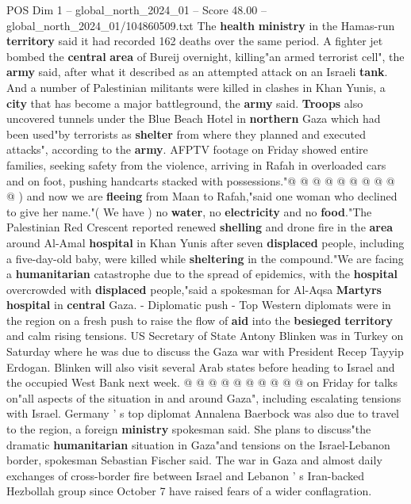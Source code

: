 \begin{textsample}{POS Dim 1 – global\_north\_2024\_01 – Score 48.00 – global\_north\_2024\_01/104860509.txt}
The \textbf{health} \textbf{ministry} in the Hamas-run \textbf{territory} said it had recorded 162 deaths over the same period.
A fighter jet bombed the \textbf{central} \textbf{area} of Bureij overnight, killing"an armed terrorist cell", the \textbf{army} said, after what it described as an attempted attack on an Israeli \textbf{tank}.
And a number of Palestinian militants were killed in clashes in Khan Yunis, a \textbf{city} that has become a major battleground, the \textbf{army} said. \textbf{Troops} also uncovered tunnels under the Blue Beach Hotel in \textbf{northern} Gaza which had been used"by terrorists as \textbf{shelter} from where they planned and executed attacks", according to the \textbf{army}.
AFPTV footage on Friday showed entire families, seeking safety from the violence, arriving in Rafah in overloaded cars and on foot, pushing handcarts stacked with possessions."@ @ @ @ @ @ @ @ @ @ ) and now we are \textbf{fleeing} from Maan to Rafah,"said one woman who declined to give her name."( We have ) no \textbf{water}, no \textbf{electricity} and no \textbf{food}."The Palestinian Red Crescent reported renewed \textbf{shelling} and drone fire in the \textbf{area} around Al-Amal \textbf{hospital} in Khan Yunis after seven \textbf{displaced} people, including a five-day-old baby, were killed while \textbf{sheltering} in the compound."We are facing a \textbf{humanitarian} catastrophe due to the spread of epidemics, with the \textbf{hospital} overcrowded with \textbf{displaced} people,"said a spokesman for Al-Aqsa \textbf{Martyrs} \textbf{hospital} in \textbf{central} Gaza. - Diplomatic push - Top Western diplomats were in the region on a fresh push to raise the flow of \textbf{aid} into the \textbf{besieged} \textbf{territory} and calm rising tensions.
US Secretary of State Antony Blinken was in Turkey on Saturday where he was due to discuss the Gaza war with President Recep Tayyip Erdogan.
Blinken will also visit several Arab states before heading to Israel and the occupied West Bank next week. @ @ @ @ @ @ @ @ @ @ on Friday for talks on"all aspects of the situation in and around Gaza", including escalating tensions with Israel.
Germany ' s top diplomat Annalena Baerbock was also due to travel to the region, a foreign \textbf{ministry} spokesman said.
She plans to discuss"the dramatic \textbf{humanitarian} situation in Gaza"and tensions on the Israel-Lebanon border, spokesman Sebastian Fischer said.
The war in Gaza and almost daily exchanges of cross-border fire between Israel and Lebanon ' s Iran-backed Hezbollah group since October 7 have raised fears of a wider conflagration.

\end{textsample}
